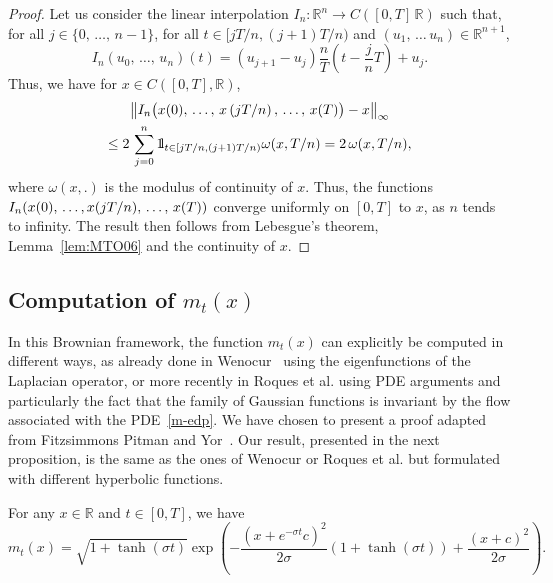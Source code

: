 \documentclass[AHL,Unicode,longabstracts,published]{cedram}
\newcommand*\R{\mathbb{R}}
\newcommand*\ind{{\mathchoice {\rm 1\mskip-4mu l} {\rm 1\mskip-4mu l} {\rm 1\mskip-4.5mu l} {\rm 1\mskip-5mu l}}}
\begin{document}
\begin{proof}
Let us consider the linear interpolation $I_{n}:\R^{n}\to C([0,T]\,\R)$ such that, for all $j\in\{0,\,\ldots,\,n-1\}$, for all $t\in[jT/n,(j+1)T/n)$ and $(u_1,\,\dots\,u_n)\in \R^{n+1}$,
\[
I_{n}\left(u_{0},\,\ldots,\,u_{n}\right)(t)=\left(u_{j+1}-u_{j}\right)\frac{n}{T}\left(t-\frac{j}{n}T\right)+u_{j}.
\]
Thus, we have for $x\in C([0,T],\R)$,
\begin{multline}
\left\|I_{n}\big(x(0),\,\ldots,\,x\left(jT/n\right),\,\ldots,\,x(T)\big)-x\right\|_\infty\\
\leq 2\, \sum_{j=0}^{n}\ind_{t \in \left[jT/n, (j+1)T/n\right)}\omega(x,T/n)= 2\, \omega(x, T/n),
\end{multline}
where $\omega(x,.)$ is the modulus of continuity of $x$. Thus, the functions $I_{n}(x(0),\,\ldots,\linebreak x(jT/n),\,\ldots,\,x(T))$ converge uniformly on $[0,T]$ to $x$, as $n$ tends to infinity. The result then follows from Lebesgue's theorem, Lemma~\ref{lem:MTO06} and the continuity of $x$.
\end{proof}

\subsection{Computation of \texorpdfstring{$m_{t}(x)$}{mt(x)}}
In this Brownian framework, the function $m_t(x)$ can explicitly be computed in different ways, as already done in Wenocur~\cite{wenocur86} using the eigenfunctions of the Laplacian operator, or more recently in Roques et al. \cite{roques20} using PDE arguments and particularly the fact that the family of Gaussian functions is invariant by the flow associated with the PDE~\eqref{m-edp}. We have chosen to present a proof adapted from Fitzsimmons Pitman and Yor~\cite{fitzsimmons1993markovian}. Our result, presented in the next proposition, is the same as the ones of Wenocur or Roques et al. but formulated with different hyperbolic functions.

\begin{prop}\label{prop:mtx}
For any $x\in \R$ and $t\in [0,T]$, we have
\begin{equation}\label{def:m}
m_{t}(x)=\sqrt{1+\tanh(\sigma t)}\exp\left(-\frac{\left(x+e^{-\sigma t}c \right)^2}{2\sigma}\left(1+\tanh(\sigma t) \right)+\frac{(x+c)^2}{2\sigma} \right).
\end{equation}
\end{prop}
\end{document}
